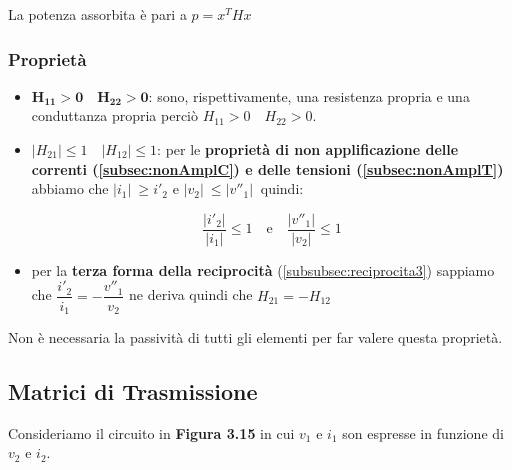 \documentclass[a4paper]{report}
\begin{document}
La potenza assorbita \`e pari a $p=x^THx$

\subsubsection{Propriet\`a}
\begin{itemize}
\item $\mathbf{H_{11} > 0 \quad H_{22} > 0}$: sono, rispettivamente,
  una resistenza propria e una conduttanza propria perci\`o
  $H_{11} > 0 \quad H_{22} > 0$.
\item $|H_{21}| \leq 1 \quad |H_{12}| \leq 1$: per le {\bf propriet\`a
  di non applificazione delle correnti (\ref{subsec:nonAmplC}) e delle
  tensioni (\ref{subsec:nonAmplT})} abbiamo che $|i_1|\ \geq i'_2$ e
  $|v_2|\ \leq |v''_1|\ $ quindi:

  \[
  \dfrac{|i'_2|}{|i_1|} \leq 1 \quad \text{e} \quad
  \dfrac{|v''_1|}{|v_2|} \leq 1
  \]
  
\item per la {\bf terza forma della reciprocit\`a}
  (\ref{subsubsec:reciprocita3}) sappiamo che $\dfrac{i'_2}{i_1} =
  -\dfrac{v''_1}{v_2}$ ne deriva quindi che $H_{21}=-H_{12}$
\end{itemize}

Non \`e necessaria la passivit\`a di tutti gli elementi per far valere
questa propriet\`a.

\subsection{Matrici di Trasmissione}
Consideriamo il circuito in {\bf Figura 3.15} in cui $v_1$ e $i_1$ son
espresse in funzione di $v_2$ e $i_2$.
\end{document}
